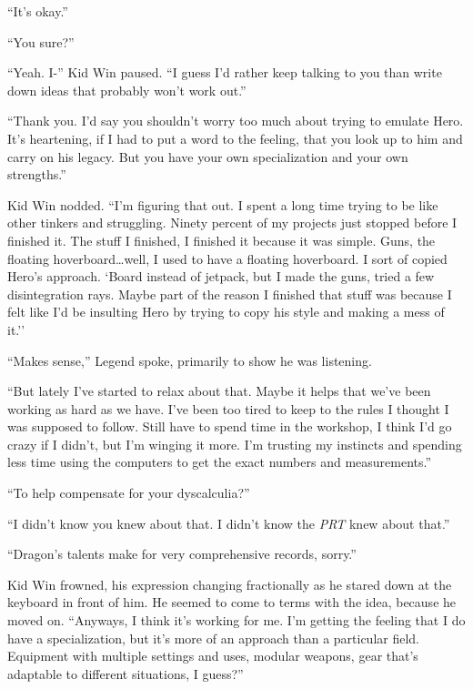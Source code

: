 ``It's okay.''



``You sure?''



``Yeah.  I-'' Kid Win paused.  ``I guess I'd rather keep talking to you than write down ideas that probably won't work out.''



``Thank you.  I'd say you shouldn't worry too much about trying to emulate Hero.  It's heartening, if I had to put a word to the feeling, that you look up to him and carry on his legacy.  But you have your own specialization and your own strengths.''



Kid Win nodded.  ``I'm figuring that out.  I spent a long time trying to be like other tinkers and struggling.  Ninety percent of my projects just stopped before I finished it.  The stuff I finished, I finished it because it was simple.  Guns, the floating hoverboard\ldots well, I used to have a floating hoverboard.  I sort of copied Hero's approach.  `Board instead of jetpack, but I made the guns, tried a few disintegration rays.  Maybe part of the reason I finished that stuff was because I felt like I'd be insulting Hero by trying to copy his style and making a mess of it.''



``Makes sense,'' Legend spoke, primarily to show he was listening.



``But lately I've started to relax about that.  Maybe it helps that we've been working as hard as we have.  I've been too tired to keep to the rules I thought I was supposed to follow.  Still have to spend time in the workshop, I think I'd go crazy if I didn't, but I'm winging it more.  I'm trusting my instincts and spending less time using the computers to get the exact numbers and measurements.''



``To help compensate for your dyscalculia?''



``I didn't know you knew about that.  I didn't know the \emph{PRT} knew about that.''



``Dragon's talents make for very comprehensive records, sorry.''



Kid Win frowned, his expression changing fractionally as he stared down at the keyboard in front of him.  He seemed to come to terms with the idea, because he moved on. ``Anyways, I think it's working for me.  I'm getting the feeling that I do have a specialization, but it's more of an approach than a particular field.  Equipment with multiple settings and uses, modular weapons, gear that's adaptable to different situations, I guess?''



